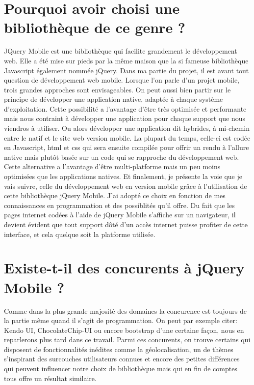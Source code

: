 \documentclass[letterpaper,10pt,french]{sphinxmanual}
\begin{document}
\section{Pourquoi avoir choisi une bibliothèque de ce genre ?}
\label{presentation_jQM:pourquoi-avoir-choisi-une-bibliotheque-de-ce-genre}
JQuery Mobile est une bibliothèque qui facilite grandement le développement web.
Elle a été mise sur pieds par la même maison que la si fameuse bibliothèque
Javascript également nommée jQuery. Dans ma partie du projet, il est avant tout
question de développement web mobile. Lorsque l'on parle d'un projet mobile, trois
grandes approches sont envisageables. On peut aussi bien partir sur le principe
de développer une application native, adaptée à chaque système d'exploitation.
Cette possibilité a l'avantage d'être très optimisée et performante mais nous
contraint à développer une application pour chaque support que nous viendros
à utiliser. Ou alors développer une application dit hybrides, à mi-chemin entre le natif et
le site web version mobile. La plupart du temps, celle-ci est codée en Javascript,
html et css qui sera ensuite compilée pour offrir un rendu à l'allure native mais
plutôt basée sur un code qui se rapproche du développement web. Cette alternative
a l'avantage d'être multi-platforme mais un peu moins optimisées que les
applications natives. Et finalement, je présente la voie que je vais suivre,
celle du développement web en version mobile grâce à l'utilisation de cette
bibliothèque jQuery Mobile. J'ai adopté ce choix en fonction de mes connaissances
en programmation et des possiblités qu'il offre. Du fait que les pages internet
codées à l'aide de jQuery Mobile s'affiche sur un navigateur, il devient
évident que tout support dôté d'un accès internet puisse profiter de cette interface,
et cela quelque soit la platforme utilisée.


\section{Existe-t-il des concurents à jQuery Mobile ?}
\label{presentation_jQM:existe-t-il-des-concurents-a-jquery-mobile}
Comme dans la plus grande majosité des domaines la concurence est toujours de
la partie même quand il s'agit de programmation. On peut par exemple citer:
Kendo UI, ChocolateChip-UI ou encore bootstrap d'une certaine façon, nous en
reparlerons plus tard dans ce travail. Parmi ces concurents, on trouve certains
qui disposent de fonctionnalités inédites comme la géolocalisation, un de thèmes
s'inspirant des surcouches utilisateurs connues et encore des petites différences
qui peuvent influencer notre choix de bibliothèque mais qui en fin de comptes
tous offre un résultat similaire.
\end{document}
